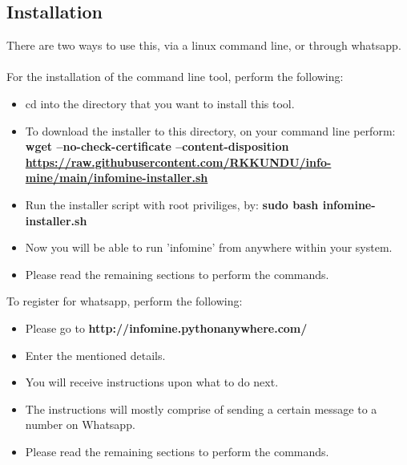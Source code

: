 \documentclass[12pt, a4paper]{article}
\begin{document}
    \subsection{Installation}
        There are two ways to use this, via a linux command line, or through whatsapp. \\ 
        \\
        For the installation of the command line tool, perform the following:
        \begin{itemize}
            \item cd into the directory that you want to install this tool.
            \item To download the installer to this directory, on your command line perform: \\
            \textbf{wget --no-check-certificate --content-disposition \url{https://raw.githubusercontent.com/RKKUNDU/info-mine/main/infomine-installer.sh}}
            \item Run the installer script with root priviliges, by: \textbf{sudo bash infomine-installer.sh}
            \item Now you will be able to run 'infomine' from anywhere within your system.
            \item Please read the remaining sections to perform the commands.
        \end{itemize} 
        To register for whatsapp, perform the following:
        \begin{itemize}
            \item Please go to \textbf{http://infomine.pythonanywhere.com/}
            \item Enter the mentioned details.
            \item You will receive instructions upon what to do next.
            \item The instructions will mostly comprise of sending a certain message to a number on Whatsapp.
            \item Please read the remaining sections to perform the commands.
        \end{itemize}
\end{document}
